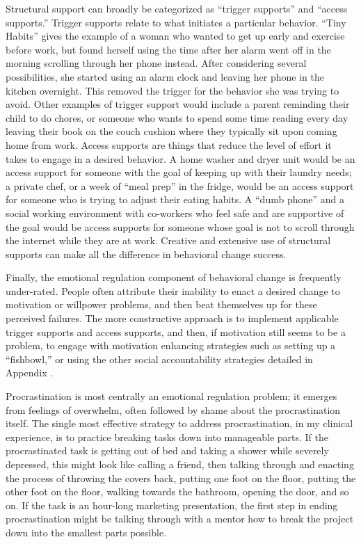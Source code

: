 \documentclass[12pt,letterpaper]{book}
\begin{document}
Structural support can broadly be categorized as “trigger supports” and “access supports.” Trigger supports relate to what initiates a particular behavior. “Tiny Habits” gives the example of a woman who wanted to get up early and exercise before work, but found herself using the time after her alarm went off in the morning scrolling through her phone instead. After considering several possibilities, she started using an alarm clock and leaving her phone in the kitchen overnight. This removed the trigger for the behavior she was trying to avoid. Other examples of trigger support would include a parent reminding their child to do chores, or someone who wants to spend some time reading every day leaving their book on the couch cushion where they typically sit upon coming home from work. Access supports are things that reduce the level of effort it takes to engage in a desired behavior. A home washer and dryer unit would be an access support for someone with the goal of keeping up with their laundry needs; a private chef, or a week of “meal prep” in the fridge, would be an access support for someone who is trying to adjust their eating habits. A “dumb phone” and a social working environment with co-workers who feel safe and are supportive of the goal would be access supports for someone whose goal is not to scroll through the internet while they are at work. Creative and extensive use of structural supports can make all the difference in behavioral change success.

Finally, the emotional regulation component of behavioral change is frequently under-rated. People often attribute their inability to enact a desired change to motivation or willpower problems, and then beat themselves up for these perceived failures. The more constructive approach is to implement applicable trigger supports and access supports, and then, if motivation still seems to be a problem, to engage with motivation enhancing strategies such as setting up a “fishbowl,” or using the other social accountability strategies detailed in Appendix \todo{}.

Procrastination is most centrally an emotional regulation problem; it emerges from feelings of overwhelm, often followed by shame about the procrastination itself. The single most effective strategy to address procrastination, in my clinical experience, is to practice breaking tasks down into manageable parts. If the procrastinated task is getting out of bed and taking a shower while severely depressed, this might look like calling a friend, then talking through and enacting the process of throwing the covers back, putting one foot on the floor, putting the other foot on the floor, walking towards the bathroom, opening the door, and so on. If the task is an hour-long marketing presentation, the first step in ending procrastination might be talking through with a mentor how to break the project down into the smallest parts possible.
\end{document}
